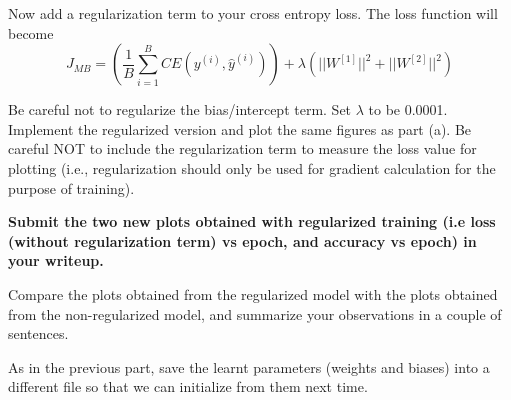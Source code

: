 \item {} Now add a regularization term to your cross entropy loss.
The loss function will become \begin{equation*}
  J_{MB} = \left(\frac{1}{B}\sum_{i=1}^{B}CE(y^{(i)}, \hat{y}^{(i)})\right) + \lambda \left(||W^{[1]}||^2 + ||W^{[2]}||^2 \right)
  \end{equation*}

Be careful not to regularize the bias/intercept term.
Set $\lambda$ to be 0.0001. Implement the regularized version and plot the same
figures as part (a). Be careful NOT to include the regularization term to measure
the loss value for plotting (i.e., regularization should only be used for gradient calculation for
the purpose of training).

\textbf{Submit the two new plots obtained with regularized training (i.e loss (without regularization term) vs epoch, and accuracy vs epoch) in your writeup.}

Compare the plots obtained from the regularized model with the plots obtained
from the non-regularized model, and summarize your observations in a couple of sentences.

As in the previous part, save the learnt parameters (weights and biases) into a
different file so that we can initialize from them next time.

